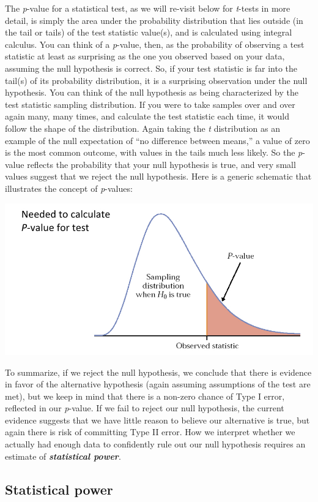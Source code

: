\documentclass[]{book}
\begin{document}
The \emph{p}-value for a statistical test, as we will re-visit below for \emph{t}-tests in more detail, is simply the area under the probability distribution that lies outside (in the tail or tails) of the test statistic value(s), and is calculated using integral calculus. You can think of a \emph{p}-value, then, as the probability of observing a test statistic at least as surprising as the one you observed based on your data, assuming the null hypothesis is correct. So, if your test statistic is far into the tail(s) of its probability distribution, it is a surprising observation under the null hypothesis. You can think of the null hypothesis as being characterized by the test statistic sampling distribution. If you were to take samples over and over again many, many times, and calculate the test statistic each time, it would follow the shape of the distribution. Again taking the \emph{t} distribution as an example of the null expectation of ``no difference between means,'' a value of zero is the most common outcome, with values in the tails much less likely. So the \emph{p}-value reflects the probability that your null hypothesis is true, and very small values suggest that we reject the null hypothesis. Here is a generic schematic that illustrates the concept of \emph{p}-values:

\begin{center}\includegraphics[width=0.5\linewidth]{images/week_3.009} \end{center}

To summarize, if we reject the null hypothesis, we conclude that there is evidence in favor of the alternative hypothesis (again assuming assumptions of the test are met), but we keep in mind that there is a non-zero chance of Type I error, reflected in our \emph{p}-value. If we fail to reject our null hypothesis, the current evidence suggests that we have little reason to believe our alternative is true, but again there is risk of committing Type II error. How we interpret whether we actually had enough data to confidently rule out our null hypothesis requires an estimate of \textbf{\emph{statistical power}}.

\hypertarget{statistical-power}{%
\subsection{Statistical power}\label{statistical-power}}
\end{document}
